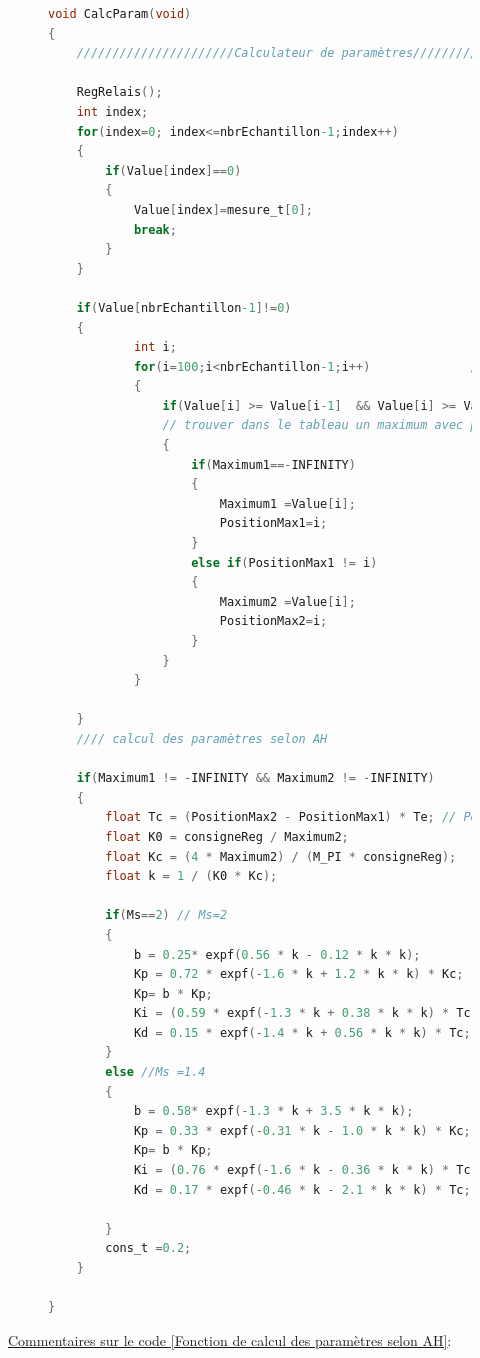 \newpage
\begin{figure}[h]
\begin{lstlisting}[language=C,caption={Fonction de calcul des paramètres selon AH}, label={Fonction de calcul des paramètres delon AH}]
void CalcParam(void)
{
	//////////////////////Calculateur de paramètres///////////////////////////////////
	
	RegRelais();
	int index;
	for(index=0; index<=nbrEchantillon-1;index++)            // Remplissage du tableau Value avec les valeurs mesurées
	{
		if(Value[index]==0)
		{
			Value[index]=mesure_t[0];
			break;
		}
	}
	
	if(Value[nbrEchantillon-1]!=0)                          //test si la dernière cellule du tableau est remplie (!=0)
	{
			int i;
			for(i=100;i<nbrEchantillon-1;i++)              // Trouver les maximums locaux en passant les 100 premières cellules à cause des transitoires et ADC qui donnent des valeurs fausses
			{
				if(Value[i] >= Value[i-1]  && Value[i] >= Value[i-2]  && Value[i]>= Value[i+1] && Value[i] >= Value[i+2])
				// trouver dans le tableau un maximum avec plusieurs condition à cause des transitoire et de l'ADC
				{
					if(Maximum1==-INFINITY)
					{
						Maximum1 =Value[i];
						PositionMax1=i;
					}
					else if(PositionMax1 != i)
					{
						Maximum2 =Value[i];
						PositionMax2=i;
					}
				}
			}
		
	}
	//// calcul des paramètres selon AH
	
	if(Maximum1 != -INFINITY && Maximum2 != -INFINITY)
	{
		float Tc = (PositionMax2 - PositionMax1) * Te; // Période d'oscillation
		float K0 = consigneReg / Maximum2;
		float Kc = (4 * Maximum2) / (M_PI * consigneReg);
		float k = 1 / (K0 * Kc);
			
		if(Ms==2) // Ms=2
		{
			b = 0.25* expf(0.56 * k - 0.12 * k * k);
			Kp = 0.72 * expf(-1.6 * k + 1.2 * k * k) * Kc;
			Kp= b * Kp;
			Ki = (0.59 * expf(-1.3 * k + 0.38 * k * k) * Tc);
			Kd = 0.15 * expf(-1.4 * k + 0.56 * k * k) * Tc;
		}
		else //Ms =1.4
		{
			b = 0.58* expf(-1.3 * k + 3.5 * k * k);
			Kp = 0.33 * expf(-0.31 * k - 1.0 * k * k) * Kc;
			Kp= b * Kp;
			Ki = (0.76 * expf(-1.6 * k - 0.36 * k * k) * Tc);
			Kd = 0.17 * expf(-0.46 * k - 2.1 * k * k) * Tc;
			
		}
		cons_t =0.2;
	}
	
}
	\end{lstlisting}
\end{figure}
\newpage
\underline{Commentaires sur le code \ref{Fonction de calcul des paramètres selon AH}}:\\

